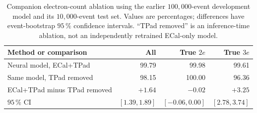 \begin{table}[htbp]
    \centering
    \small
    \setlength{\tabcolsep}{5pt}
    \caption{Companion electron-count ablation using the earlier
    \(100{,}000\)-event development model and its \(10{,}000\)-event test set.
    Values are percentages; differences have event-bootstrap \(95\,\%\)
    confidence intervals. ``TPad removed'' is an inference-time ablation, not
    an independently retrained ECal-only model.}
    \label{tab:results_tpad_count}
    \begin{tabular}{lrrr}
        \hline
        Method or comparison & All & True \(2e\) & True \(3e\) \\
        \hline
        Neural model, ECal+TPad & 99.79 & 99.98 & 99.61 \\
        Same model, TPad removed & 98.15 & 100.00 & 96.36 \\
        \hline
        ECal+TPad minus TPad removed & \(+1.64\) & \(-0.02\) & \(+3.25\) \\
        \(95\,\%\) CI & \([1.39,1.89]\) & \([-0.06,0.00]\) & \([2.78,3.74]\) \\
        \hline
    \end{tabular}
\end{table}
